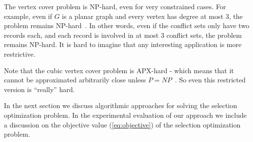 The vertex cover problem is NP-hard, even for very constrained cases. For example, even if $G$ is a planar graph and every vertex has degree at most 3, the problem remains NP-hard~\cite{garey1977rectilinear}. In other words, even if the conflict sets only have two records each, and each record is involved in at most 3 conflict sets, the problem remains NP-hard. It is hard to imagine that any interesting application is more restrictive.

Note that the cubic vertex cover problem is APX-hard - which means that it cannot be approximated arbitrarily close unless $P=NP$~\cite{alimonti2000some}. So even this restricted version is ``really'' hard.

In the next section we discuss algorithmic approaches for solving the selection optimization problem. In the experimental evaluation of our approach we include a discussion on the objective value (\ref{eq:objective}) of the selection optimization problem.
